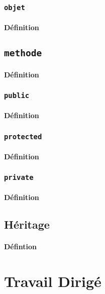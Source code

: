 \documentclass{article}
\begin{document}
\subsubsection{\texttt{objet}}
\paragraph{Définition}

\subsection{\texttt{methode}}
\paragraph{Définition}

\subsubsection{\texttt{public}}
\paragraph{Définition}

\subsubsection{\texttt{protected}}
\paragraph{Définition}

\subsubsection{\texttt{private}}
\paragraph{Définition}

\subsection{Héritage}
\paragraph{Défintion}


\section{Travail Dirigé}
\end{document}
